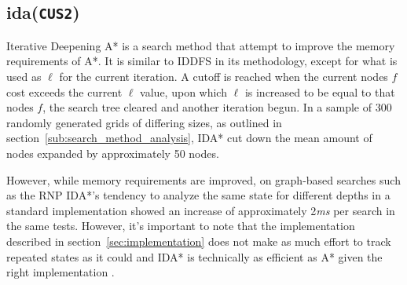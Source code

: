 \subsection{\texorpdfstring{\acrfull{ida}(\texttt{CUS2})}{IDA}} %
\label{sub:texorpdfstring}
Iterative Deepening A* is a search method that attempt to improve the memory requirements of A*. It is similar to IDDFS in its methodology, except for what is used as $\ell$ for the current iteration. A cutoff is reached when the current nodes $f$ cost exceeds the current $\ell$ value, upon which $\ell$ is increased to be equal to that nodes $f$, the search tree cleared and another iteration begun. In a sample of 300 randomly generated grids of differing sizes, as outlined in section~\ref{sub:search_method_analysis}, IDA* cut down the mean amount of nodes expanded by approximately 50 nodes.\par
However, while memory requirements are improved, on graph-based searches such as the RNP IDA*'s tendency to analyze the same state for different depths in a standard implementation showed an increase of approximately 2\textit{ms} per search in the same tests. However, it's important to note that the implementation described in section~\ref{sec:implementation} does not make as much effort to track repeated states as it could and IDA* is technically as efficient as A* given the right implementation \parencite{idas}.


